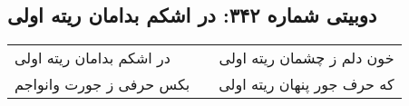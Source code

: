 \begin{center}
\section*{دوبیتی شماره ۳۴۲: در اشکم بدامان ریته اولی}
\label{sec:342}
\begin{longtable}{l p{0.5cm} r}
در اشکم بدامان ریته اولی
&&
خون دلم ز چشمان ریته اولی
\\
بکس حرفی ز جورت وانواجم
&&
که حرف جور پنهان ریته اولی
\\
\end{longtable}
\end{center}
